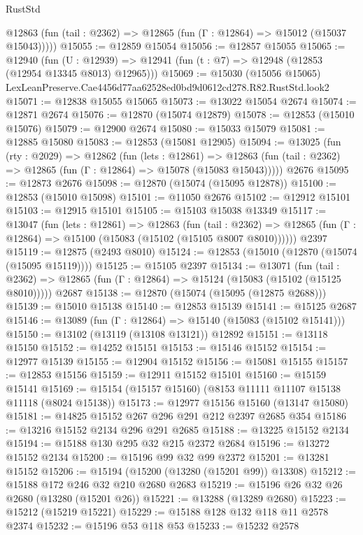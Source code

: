 \begin{lexlean}{RustStd}
\begin{coremodule}
      @12863 (fun (tail : @2362) => @12865 (fun (Γ : @12864) => @15012 (@15037 @15043)))))
@15055 := @12859 @15054
@15056 := @12857 @15055
@15065 := @12940
    (fun (U : @12939) => @12941 (fun (t : @7) => @12948 (@12853 (@12954 @13345 @8013) @12965)))
@15069 := @15030 (@15056 @15065) LexLeanPreserve.Cae4456d77aa62528ed0bd9d0612cd278.R82.RustStd.look2
@15071 := @12838 @15055 @15065
@15073 := @13022 @15054 @2674
@15074 := @12871 @2674
@15076 := @12870 (@15074 @12879)
@15078 := @12853 (@15010 @15076)
@15079 := @12900 @2674
@15080 := @15033 @15079
@15081 := @12885 @15080
@15083 := @12853 (@15081 @12905)
@15094 := @13025
    (fun (rty : @2029) =>
    @12862
      (fun (lets : @12861) =>
      @12863 (fun (tail : @2362) => @12865 (fun (Γ : @12864) => @15078 (@15083 @15043)))))
    @2676
@15095 := @12873 @2676
@15098 := @12870 (@15074 (@15095 @12878))
@15100 := @12853 (@15010 @15098)
@15101 := @11050 @2676
@15102 := @12912 @15101
@15103 := @12915 @15101
@15105 := @15103 @15038 @13349
@15117 := @13047
    (fun (lets : @12861) =>
    @12863
      (fun (tail : @2362) =>
      @12865 (fun (Γ : @12864) => @15100 (@15083 (@15102 (@15105 @8007 @8010))))))
    @2397
@15119 := @12875 (@2493 @8010)
@15124 := @12853 (@15010 (@12870 (@15074 (@15095 @15119))))
@15125 := @15105 @2397
@15134 := @13071
    (fun (tail : @2362) => @12865 (fun (Γ : @12864) => @15124 (@15083 (@15102 (@15125 @8010)))))
    @2687
@15138 := @12870 (@15074 (@15095 (@12875 @2688)))
@15139 := @15010 @15138
@15140 := @12853 @15139
@15141 := @15125 @2687
@15146 := @13089 (fun (Γ : @12864) => @15140 (@15083 (@15102 @15141)))
@15150 := @13102 (@13119 (@13108 @13121)) @12892
@15151 := @13118 @15150
@15152 := @14252 @15151
@15153 := @15146 @15152
@15154 := @12977 @15139
@15155 := @12904 @15152
@15156 := @15081 @15155
@15157 := @12853 @15156
@15159 := @12911 @15152 @15101
@15160 := @15159 @15141
@15169 := @15154 (@15157 @15160) (@8153 @11111 @11107 @15138 @11118 (@8024 @15138))
@15173 := @12977 @15156 @15160 (@13147 @15080)
@15181 := @14825 @15152 @267 @296 @291 @212 @2397 @2685 @354
@15186 := @13216 @15152 @2134 @296 @291 @2685
@15188 := @13225 @15152 @2134
@15194 := @15188 @130 @295 @32 @215 @2372 @2684
@15196 := @13272 @15152 @2134
@15200 := @15196 @99 @32 @99 @2372
@15201 := @13281 @15152
@15206 := @15194 (@15200 (@13280 (@15201 @99)) @13308)
@15212 := @15188 @172 @246 @32 @210 @2680 @2683
@15219 := @15196 @26 @32 @26 @2680 (@13280 (@15201 @26))
@15221 := @13288 (@13289 @2680)
@15223 := @15212 (@15219 @15221)
@15229 := @15188 @128 @132 @118 @11 @2578 @2374
@15232 := @15196 @53 @118 @53
@15233 := @15232 @2578

\end{coremodule}
\end{lexlean}

